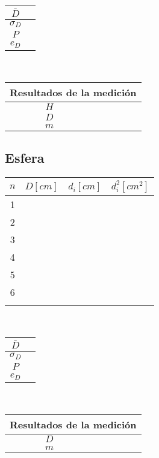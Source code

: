 \documentclass[letter,11pt]{article}
\begin{document}
\vspace{0.5cm}
\begin{tabular}{|c|p{2.0cm}|}
\hline
$\bar{D}$ & \\ \hline
$\sigma_D$ & \\ \hline
$P$ & \\ \hline
$e_D$ & \\ \hline
\end{tabular}\\

\vspace{1.4cm}
\begin{tabular}{|c|p{2.0cm}|}
\hline
\multicolumn{2}{|c|}{Resultados de la medición} \\ \hline
$H$ & \\ \hline
$D$ & \\ \hline
$m$ & \\ \hline
\end{tabular}

\subsection{Esfera}
\begin{tabular}{|c|>{\centering}m{2.0cm}<{\centering}
                  |>{\centering}m{2.0cm}<{\centering}
                  |>{\centering}m{2.0cm}<{\centering}|}
\hline
\textbf{$n$} & \textbf{$D[cm]$}
             & \textbf{$d_i[cm]$}
             & \textbf{$d_i^2[cm^2]$} \tabularnewline \hline
1 & & & \\ \hline
2 & & & \\ \hline
3 & & & \\ \hline
4 & & & \\ \hline
5 & & & \\ \hline
6 & & & \\ \hline
 & & & \\ \hline
\end{tabular}\\

\vspace{0.5cm}
\begin{tabular}{|c|p{2.0cm}|}
\hline
$\bar{D}$ & \\ \hline
$\sigma_D$ & \\ \hline
$P$ & \\ \hline
$e_D$ & \\ \hline
\end{tabular}\\

\vspace{1.4cm}
\begin{tabular}{|c|p{2.0cm}|}
\hline
\multicolumn{2}{|c|}{Resultados de la medición} \\ \hline
$D$ & \\ \hline
$m$ & \\ \hline
\end{tabular}
\end{document}
